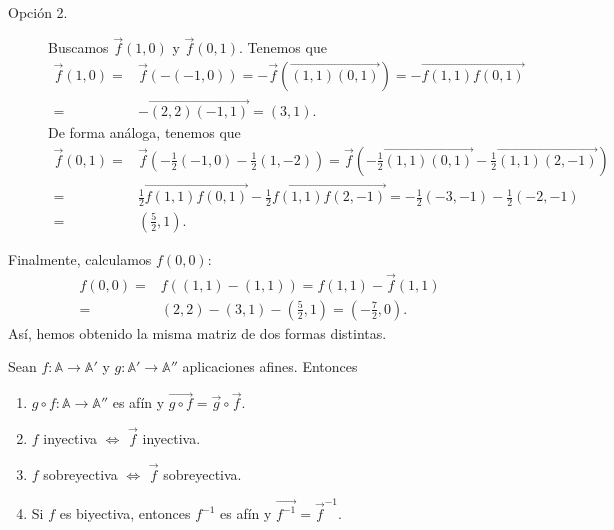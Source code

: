 \begin{eg}
\begin{description}
\[\begin{split}
\end{split}
\]
\item[Opción 2.] Buscamos $\displaystyle \vec{f}\left(1,0\right) $ y $\displaystyle \vec{f}\left(0,1\right) $. Tenemos que
	\[
	\begin{split}
		\vec{f}\left(1,0\right) = & \vec{f}\left(-\left(-1,0\right)\right) = -\vec{f}\left(\overrightarrow{\left(1,1\right)\left(0,1\right)}\right) = - \overrightarrow{f\left(1,1\right)f\left(0,1\right)} \\
		= &  -\overrightarrow{\left(2,2\right)\left(-1,1\right)} = \left(3,1\right) .
	\end{split}
	\]
	De forma análoga, tenemos que 
	\[
	\begin{split}
		\vec{f}\left(0,1\right) = & \vec{f}\left(-\frac{1}{2}\left(-1,0\right) -\frac{1}{2}\left(1,-2\right)\right) = \vec{f}\left(-\frac{1}{2}\overrightarrow{\left(1,1\right)\left(0,1\right)} - \frac{1}{2}\overrightarrow{\left(1,1\right)\left(2,-1\right)}\right) \\
		= & \frac{1}{2}\overrightarrow{f\left(1,1\right)f\left(0,1\right)} - \frac{1}{2}\overrightarrow{f\left(1,1\right)f\left(2,-1\right)} = -\frac{1}{2}\left(-3,-1\right)-\frac{1}{2}\left(-2,-1\right) \\
		= & \left(\frac{5}{2},1\right) .
	\end{split}
	\]
\end{description}
Finalmente, calculamos $\displaystyle f\left(0,0\right) $:
\[
\begin{split}
	f\left(0,0\right) = & f\left(\left(1,1\right)-\left(1,1\right)\right) = f\left(1,1\right) - \vec{f}\left(1,1\right) \\
	= & \left(2,2\right)-\left(3,1\right)-\left(\frac{5}{2}, 1\right) = \left(-\frac{7}{2}, 0\right) .
\end{split}
\]
Así, hemos obtenido la misma matriz de dos formas distintas. 
\end{eg}
\begin{prop}
Sean $\displaystyle f : \mathbb{A} \to \mathbb{A}' $ y $\displaystyle g : \mathbb{A}' \to \mathbb{A}'' $ aplicaciones afines. Entonces
\begin{enumerate}
\item $\displaystyle g\circ f : \mathbb{A} \to \mathbb{A}'' $ es afín y $\displaystyle \overrightarrow{g\circ f} = \vec{g}\circ \vec{f} $.
\item $\displaystyle f $ inyectiva $\displaystyle \iff  $ $\displaystyle \vec{f} $ inyectiva.
\item $\displaystyle f $ sobreyectiva $\displaystyle \iff  $ $\displaystyle \vec{f} $ sobreyectiva.
\item Si $\displaystyle f $ es biyectiva, entonces $\displaystyle f^{-1} $ es afín y $\displaystyle \overrightarrow{f^{-1}} = \vec{f}^{-1} $.
\end{enumerate}
\end{prop}
